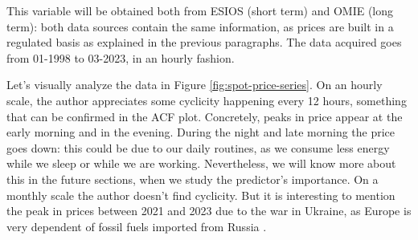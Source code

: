 This variable will be obtained both from ESIOS (short term) and OMIE (long term): both data sources contain the same information, as prices are built in a regulated basis as explained in the previous paragraphs. The data acquired goes from 01-1998 to 03-2023, in an hourly fashion.

Let's visually analyze the data in Figure \ref{fig:spot-price-series}. On an hourly scale, the author appreciates some cyclicity happening every 12 hours, something that can be confirmed in the ACF plot.
Concretely, peaks in price appear at the early morning and in the evening.
During the night and late morning the price goes down: this could be due to our daily routines, as we consume less energy while we sleep or while we are working.
Nevertheless, we will know more about this in the future sections, when we study the predictor's importance.
On a monthly scale the author doesn't find cyclicity. But it is interesting to mention the peak in prices between 2021 and 2023 due to the war in Ukraine, as Europe is very dependent of fossil fuels imported from Russia \cite{lopez2022geopolitica}.

